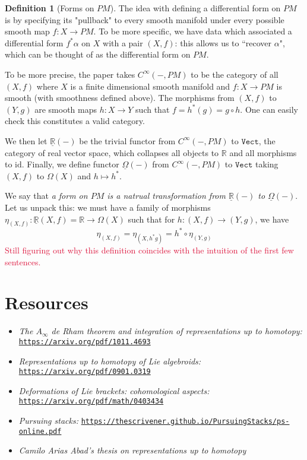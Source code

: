 \documentclass[aps,pra,showpacs,notitlepage,onecolumn,superscriptaddress,nofootinbib]{revtex4-1}
\newcommand{\pop}[1]{\textcolor{crimson}{#1}}
\theoremstyle{definition}
\newtheorem{definition}{Definition}[section]
\begin{document}
\begin{definition}[Forms on $PM$]
    The idea with defining a differential form on $PM$ is by specifying its "pullback" to every smooth manifold under every possible smooth map $f : X \rightarrow PM$.
    To be more specific, we have data which associated a differential form $f^{*} \alpha$ on $X$ with a pair $(X, f)$: this allows us to ``recover $\alpha$", which can be thought 
    of as the differential form on $PM$.

    To be more precise, the paper takes $C^{\infty}(-, PM)$ to be the category of all $(X, f)$ where $X$ is a finite dimensional smooth manifold and $f : X \rightarrow PM$ is smooth (with 
    smoothness defined above). The morphisms from $(X, f)$ to $(Y, g)$ are smooth maps $h : X \rightarrow Y$ such that $f = h^{*}(g) = g \circ h$. One can easily check 
    this constitutes a valid category.

    We then let $\underline{\mathbb{R}}(-)$ be the trivial functor from $C^{\infty}(-, PM)$ to $\texttt{Vect}$, the category of real vector space, which collapses 
    all objects to $\mathbb{R}$ and all morphisms to $\text{id}$. Finally, we define functor $\underline{\Omega}(-)$ from $C^{\infty}(-, PM)$ to $\texttt{Vect}$ 
    taking $(X, f)$ to $\Omega(X)$ and $h \mapsto h^{*}$.

    We say that \emph{a form on $PM$ is a natrual transformation from $\underline{\mathbb{R}}(-)$ to $\underline{\Omega}(-)$}. Let us unpack this: we must have
    a family of morphisms $\eta_{(X, f)} : \underline{\mathbb{R}}(X, f) = \mathbb{R} \rightarrow \Omega(X)$ such that for $h : (X, f) \rightarrow (Y, g)$, we have
    \begin{equation}
        \eta_{(X, f)} = \eta_{(X, h^{*} g)} = h^{*} \circ \eta_{(Y, g)}
    \end{equation}
    \pop{Still figuring out why this definition coincides with the intuition of the first few sentences.}
\end{definition}

\section{Resources}

\begin{itemize}
    \item \emph{The $A_{\infty}$ de Rham theorem and integration of representations up to homotopy:} \href{https://arxiv.org/pdf/1011.4693}{\texttt{https://arxiv.org/pdf/1011.4693}}
    \item \emph{Representations up to homotopy of Lie algebroids:} \href{https://arxiv.org/pdf/0901.0319}{\texttt{https://arxiv.org/pdf/0901.0319}}
    \item \emph{Deformations of Lie brackets: cohomological aspects:} \href{https://arxiv.org/pdf/math/0403434}{\texttt{https://arxiv.org/pdf/math/0403434}}
    \item \emph{Pursuing stacks:} \href{https://thescrivener.github.io/PursuingStacks/ps-online.pdf}{\texttt{https://thescrivener.github.io/PursuingStacks/ps-online.pdf}}
    \item \emph{Camilo Arias Abad's thesis on representations up to homotopy}
\end{itemize}
\end{document}

